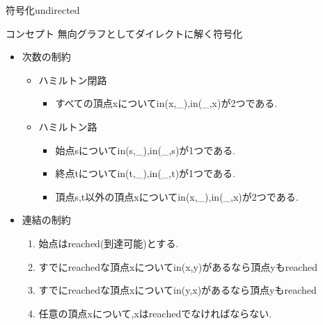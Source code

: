 \documentclass[dvipdfmx,11pt]{beamer}
\begin{document}
\begin{frame}[fragile]{符号化undirected}
  \begin{alertblock}{コンセプト}
    無向グラフとしてダイレクトに解く符号化
  \end{alertblock}
  \begin{itemize}
  \item \alert{次数の制約}
    \begin{itemize}
    \item ハミルトン閉路
      \begin{itemize}
      \item すべての頂点xについてin(x,\_),in(\_,x)が2つである.
      \end{itemize}
    \item ハミルトン路
      \begin{itemize}
      \item 始点sについてin(s,\_),in(\_,s)が1つである.
      \item 終点tについてin(t,\_),in(\_,t)が1つである.
      \item 頂点s,t以外の頂点xについてin(x,\_),in(\_,x)が2つである.
      \end{itemize}
    \end{itemize}
  \item \alert{連結の制約}
    \begin{enumerate}
    \item 始点はreached(到達可能)とする.
    \item すでにreachedな頂点xについてin(x,y)があるなら頂点yもreached
    \item すでにreachedな頂点xについてin(y,x)があるなら頂点yもreached
    \item 任意の頂点xについて,xはreachedでなければならない.
    \end{enumerate}
  \end{itemize}
\end{frame}
\end{document}

